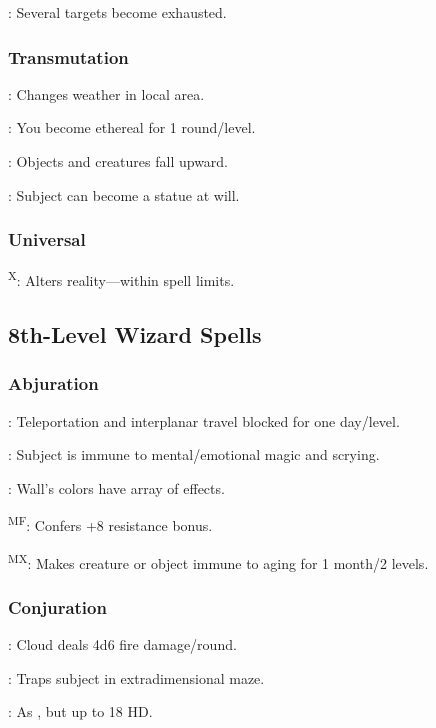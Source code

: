 	: Several targets become exhausted.

\subsubsection{Transmutation}
	: Changes weather in local area.

	: You become ethereal for 1 round/level.

	: Objects and creatures fall upward.

	: Subject can become a statue at will.

\subsubsection{Universal}
	\textsuperscript{X}: Alters reality---within spell limits.



\subsection{8th-Level Wizard Spells}

\subsubsection{Abjuration}
	: Teleportation and interplanar travel blocked for one day/level.

	: Subject is immune to mental/emotional magic and scrying.

	: Wall's colors have array of effects.

	\textsuperscript{MF}: Confers +8 resistance bonus.

	\textsuperscript{MX}: Makes creature or object immune to aging for 1 month/2 levels. %

\subsubsection{Conjuration}
	: Cloud deals 4d6 fire damage/round.

	: Traps subject in extradimensional maze.

	: As , but up to 18 HD.

